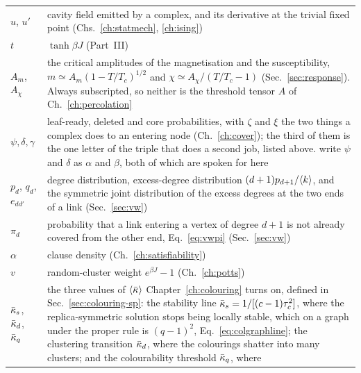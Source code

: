\begin{longtable}{@{}L{1.28in}@{\hspace{0.8em}}L{2.48in}@{}}
$u$, $u'$ & cavity field emitted by a complex, and its derivative at the trivial
            fixed point (Chs.~\ref{ch:statmech}, \ref{ch:ising})\\[3pt]
$t$ & $\tanh\beta J$ (Part~III)\\[3pt]
$A_{m}$, $A_{\chi}$ & the critical amplitudes of the magnetisation and the
            susceptibility, $m\simeq A_{m}(1-T/T_{c})^{1/2}$ and
            $\chi\simeq A_{\chi}/(T/T_{c}-1)$
            (Sec.~\ref{sec:response}). Always subscripted, so neither is
            the threshold tensor $A$ of Ch.~\ref{ch:percolation}\\[3pt]
$\psi,\delta,\gamma$ & leaf-ready, deleted and core probabilities, with $\zeta$
                       and $\xi$ the two things a complex does to an entering
                       node (Ch.~\ref{ch:cover}); the third of them is the one
                       letter of the triple that does a second job, listed
                       above. \citet{liu2012} write
                       $\psi$ and $\delta$ as $\alpha$ and $\beta$, both
                       of which are spoken for here\\[3pt]
$p_{d}$, $q_{d}$, $e_{dd'}$ & degree distribution, excess-degree
            distribution $(d+1)p_{d+1}/\langle k \rangle$, and the symmetric joint
            distribution of the excess degrees at the two ends of a link
            (Sec.~\ref{sec:vw})\\[3pt]
$\pi_{d}$ & probability that a link entering a vertex of degree $d+1$ is not
            already covered from the other end, Eq.~\eqref{eq:vwpi}
            (Sec.~\ref{sec:vw})\\[3pt]
$\alpha$ & clause density (Ch.~\ref{ch:satisfiability})\\[3pt]
$v$ & random-cluster weight $e^{\beta J}-1$ (Ch.~\ref{ch:potts})\\[3pt]
$\bar\kappa_{s}$, $\bar\kappa_{d}$, $\bar\kappa_{q}$ & the three values of $\langle \bar\kappa \rangle$
           Chapter~\ref{ch:colouring} turns on, defined in
           Sec.~\ref{sec:colouring-sp}: the stability line
           $\bar\kappa_{s}=1/[(c-1)\tau_{c}^{2}]$, where the replica-symmetric
           solution stops being locally stable, which on a graph under the
           proper rule is $(q-1)^{2}$, Eq.~\eqref{eq:colgraphline}; the
           clustering transition $\bar\kappa_{d}$, where the colourings shatter into
           many clusters; and the colourability threshold $\bar\kappa_{q}$, where

\end{longtable}
